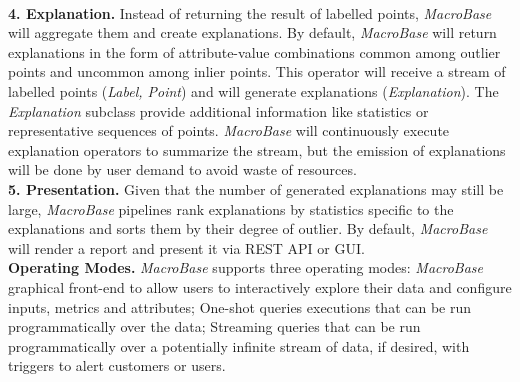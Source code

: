\documentclass[11pt, titlepage]{article}
\begin{document}
\begin{flushleft}
		\\\textbf{4. Explanation.} Instead of returning the result of labelled points, \textit{MacroBase} will aggregate them and create explanations. By default, \textit{MacroBase} will return explanations in the form of attribute-value combinations common among outlier points and uncommon among inlier points. This operator will receive a stream of labelled points (\textit{Label, Point}) and will generate explanations (\textit{Explanation}). The \textit{Explanation} subclass provide additional information like statistics or representative sequences of points. \textit{MacroBase} will continuously execute explanation operators to summarize the stream, but the emission of explanations will be done by user demand to avoid waste of resources.
		\\\textbf{5. Presentation.} Given that the number of generated explanations may still be large, \textit{MacroBase} pipelines rank explanations by statistics specific to the explanations and sorts them by their degree of outlier. By default, \textit{MacroBase} will render a report and present it via REST API or GUI.
		\\\textbf{Operating Modes.} \textit{MacroBase} supports three operating modes: \textit{MacroBase} graphical front-end to allow users to interactively explore their data and configure inputs, metrics and attributes; One-shot queries executions that can be run programmatically over the data; Streaming queries that can be run programmatically over a potentially infinite stream of data, if desired, with triggers to alert customers or users.
	\end{flushleft}
\end{document}
